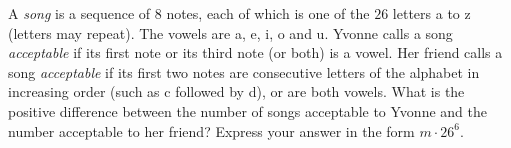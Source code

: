 A \emph{song} is a sequence of $8$ notes, each of which is one of the $26$ letters a to z (letters may repeat). The vowels are a, e, i, o and u. Yvonne calls a song \emph{acceptable} if its first note or its third note (or both) is a vowel. Her friend calls a song \emph{acceptable} if its first two notes are consecutive letters of the alphabet in increasing order (such as c followed by d), or are both vowels. What is the positive difference between the number of songs acceptable to Yvonne and the number acceptable to her friend? Express your answer in the form $m\cdot26^6$.
